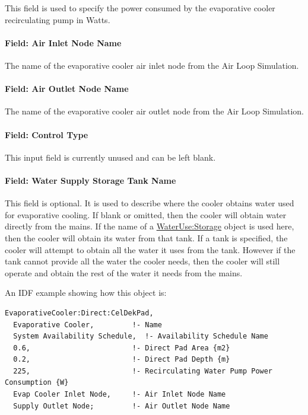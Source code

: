 This field is used to specify the power consumed by the evaporative cooler recirculating pump in Watts.

\paragraph{Field: Air Inlet Node Name}\label{field-air-inlet-node-name-001}

The name of the evaporative cooler air inlet node from the Air Loop Simulation.

\paragraph{Field: Air Outlet Node Name}\label{field-air-outlet-node-name-001}

The name of the evaporative cooler air outlet node from the Air Loop Simulation.

\paragraph{Field: Control Type}\label{field-control-type-001}

This input field is currently unused and can be left blank.

\paragraph{Field: Water Supply Storage Tank Name}\label{field-water-supply-storage-tank-name-000}

This field is optional. It is used to describe where the cooler obtains water used for evaporative cooling. If blank or omitted, then the cooler will obtain water directly from the mains. If the name of a \hyperref[waterusestorage]{WaterUse:Storage} object is used here, then the cooler will obtain its water from that tank. If a tank is specified, the cooler will attempt to obtain all the water it uses from the tank. However if the tank cannot provide all the water the cooler needs, then the cooler will still operate and obtain the rest of the water it needs from the mains.

An IDF example showing how this object is:

\begin{lstlisting}
EvaporativeCooler:Direct:CelDekPad,
  Evaporative Cooler,         !- Name
  System Availability Schedule,  !- Availability Schedule Name
  0.6,                        !- Direct Pad Area {m2}
  0.2,                        !- Direct Pad Depth {m}
  225,                        !- Recirculating Water Pump Power Consumption {W}
  Evap Cooler Inlet Node,     !- Air Inlet Node Name
  Supply Outlet Node;         !- Air Outlet Node Name
\end{lstlisting}

